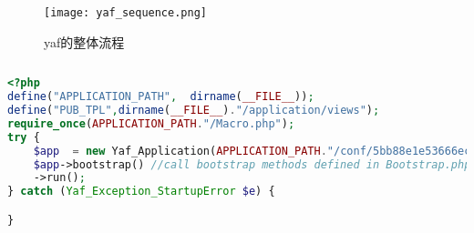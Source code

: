 \begin{figure}[htbp]
\centering
\texttt{[image: yaf\_sequence.png]}
\caption{yaf的整体流程}
\end{figure}



\begin{lstlisting}[language=PHP]

\end{lstlisting}




\begin{lstlisting}[language=PHP]
<?php
define("APPLICATION_PATH",  dirname(__FILE__));
define("PUB_TPL",dirname(__FILE__)."/application/views");
require_once(APPLICATION_PATH."/Macro.php");
try {
	$app  = new Yaf_Application(APPLICATION_PATH."/conf/5bb88e1e53666ec494f1025023c16dea.ini");
	$app->bootstrap() //call bootstrap methods defined in Bootstrap.php
    ->run();
} catch (Yaf_Exception_StartupError $e) {

}

\end{lstlisting}




\begin{lstlisting}[language=PHP]

\end{lstlisting}



\begin{lstlisting}[language=PHP]

\end{lstlisting}




\begin{lstlisting}[language=PHP]

\end{lstlisting}




\begin{lstlisting}[language=PHP]

\end{lstlisting}




\begin{lstlisting}[language=PHP]

\end{lstlisting}




\begin{lstlisting}[language=PHP]

\end{lstlisting}







